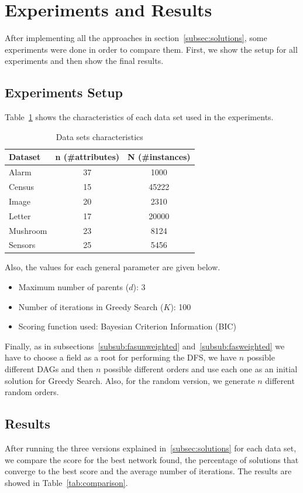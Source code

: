 \section{Experiments and Results}
\label{sec:experiments}

After implementing all the approaches in section~\ref{subsec:solutions}, some experiments were done in order to compare them. First, we show the setup for all experiments and then show the final results.

\subsection{Experiments Setup}
\label{subsec:configuration}
	Table~\ref{tab:datasets} shows the characteristics of each data set used in the experiments.
	\begin{table}[ h ]
		\centering
		\begin{tabular}{ | l | c | c | }
			\hline
			Dataset & n (\#attributes) & N (\#instances) \\ \hline
			Alarm & 37 & 1000 \\ \hline
			Census & 15 & 45222 \\ \hline
			Image & 20 & 2310 \\ \hline
			Letter & 17 & 20000 \\ \hline
			Mushroom & 23 & 8124 \\ \hline
			Sensors & 25 & 5456 \\ \hline
		\end{tabular}
		\caption{Data sets characteristics}
		\label{tab:datasets}
	\end{table}
	Also, the values for each general parameter are given below.
	\begin{itemize}
		\item Maximum number of parents ($d$): 3
		\item Number of iterations in Greedy Search ($K$): 100
		\item Scoring function used: Bayesian Criterion Information (BIC)
	\end{itemize}
	Finally, as in subsections~\ref{subsub:fasunweighted} and~\ref{subsub:fasweighted} we have to choose a field as a root for performing the DFS, we have $n$ possible different DAGs and then $n$ possible different orders and use each one as an initial solution for Greedy Search. Also, for the random version, we generate $n$ different random orders.

\subsection{Results}
\label{subsec:results}
	After running the three versions explained in~\ref{subsec:solutions} for each data set, we compare the score for the best network found, the percentage of solutions that converge to the best score and the average number of iterations. The results are showed in Table~\ref{tab:comparison}.
	
